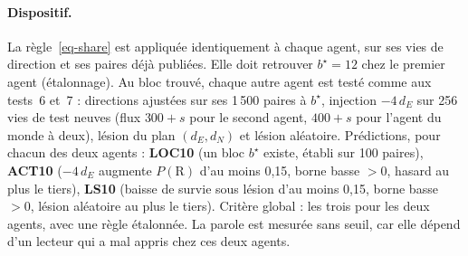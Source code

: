 \documentclass[11pt,a4paper]{article}
\newcommand{\dE}{d_{E}}
\newcommand{\dN}{d_{N}}
\begin{document}
\paragraph{Dispositif.} La règle~\eqref{eq-share} est appliquée identiquement à
chaque agent, sur ses vies de direction et ses paires déjà publiées. Elle doit
retrouver $b^\star=12$ chez le premier agent (étalonnage). Au bloc trouvé, chaque
autre agent est testé comme aux tests~6 et~7 : directions ajustées sur ses
1\,500 paires à $b^\star$, injection $-4\,\dE$ sur 256 vies de test neuves (flux
$300+s$ pour le second agent, $400+s$ pour l'agent du monde à deux), lésion du plan
$(\dE,\dN)$ et lésion aléatoire. Prédictions, pour chacun des deux agents :
\textbf{LOC10} (un bloc $b^\star$ existe, établi sur 100 paires), \textbf{ACT10}
($-4\,\dE$ augmente $P(\mathrm R)$ d'au moins 0,15, borne basse $>0$, hasard au plus
le tiers), \textbf{LS10} (baisse de survie sous lésion d'au moins 0,15, borne basse
$>0$, lésion aléatoire au plus le tiers). Critère global : les trois pour les deux
agents, avec une règle étalonnée. La parole est mesurée sans seuil, car elle dépend
d'un lecteur qui a mal appris chez ces deux agents.
\end{document}
